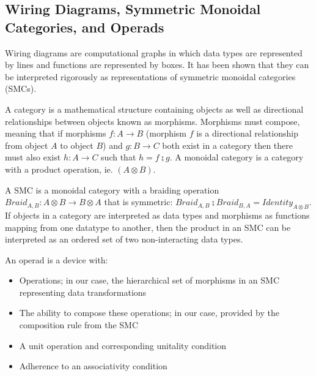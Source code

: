 \documentclass[9pt, oneside]{article}   	%
\begin{document}
\subsection{Wiring Diagrams, Symmetric Monoidal Categories, and Operads}\label{smc}

Wiring diagrams are computational graphs in which data types are represented by lines and functions are represented by boxes. It has been shown that they can be interpreted rigorously as representations of symmetric monoidal categories (SMCs). \cite{Patterson_2021} 


A category is a mathematical structure containing objects as well as directional relationships between objects known as morphisms. Morphisms must compose, meaning that if morphisms $f : A \rightarrow B$ (morphism $f$ is a directional relationship from object $A$ to object $B$) and $g : B \rightarrow C$ both exist in a category then there must also exist $h : A \rightarrow C$ such that $h = f \zcmp g$. A monoidal category is a category with a product operation, ie. $(A \otimes B)$. 

A SMC is a monoidal category with a braiding operation $Braid_{A,B} : A \otimes B \rightarrow B \otimes A$ that is symmetric: $Braid_{A,B} \zcmp Braid_{B,A}=Identity_{A \otimes B}$. If objects in a category are interpreted as data types and morphisms as functions mapping from one datatype to another, then the product in an SMC can be interpreted as an ordered set of two non-interacting data types. 

An operad \cite{operadNlab, markl2008operads, may2006geometry, may1997definitions, loday2012algebraic} is a device with:

\begin{itemize}
\item Operations; in our case, the hierarchical set of morphisms in an SMC representing data transformations
\item The ability to compose these operations; in our case, provided by the composition rule from the SMC
\item A unit operation and corresponding unitality condition
\item Adherence to an associativity condition
\end{itemize}
\end{document}

